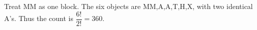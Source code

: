 Treat MM as one block. The six objects are MM,A,A,T,H,X, with two identical A's. Thus the count is $\dfrac{6!}{2!}=\boxed{360}$.
